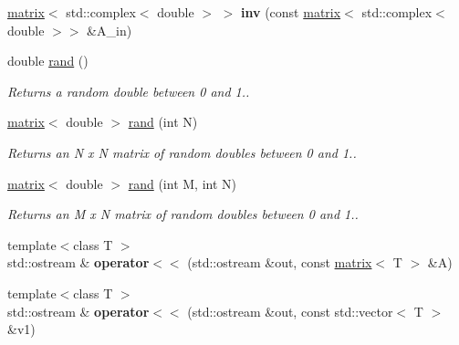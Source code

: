 \begin{DoxyCompactItemize}
\item 
\hypertarget{namespacekeycpp_a6b74369f5415c3ed45f63995149ad992}{\hyperlink{classkeycpp_1_1matrix}{matrix}$<$ std\-::complex$<$ double $>$ $>$ {\bfseries inv} (const \hyperlink{classkeycpp_1_1matrix}{matrix}$<$ std\-::complex$<$ double $>$$>$ \&A\-\_\-in)}\label{namespacekeycpp_a6b74369f5415c3ed45f63995149ad992}

\item 
\hypertarget{namespacekeycpp_a5ef5c1f5951e8182a7c4ec9612f3f7e1}{double \hyperlink{namespacekeycpp_a5ef5c1f5951e8182a7c4ec9612f3f7e1}{rand} ()}\label{namespacekeycpp_a5ef5c1f5951e8182a7c4ec9612f3f7e1}

\begin{DoxyCompactList}\small\item\em Returns a random double between 0 and 1.. \end{DoxyCompactList}\item 
\hypertarget{namespacekeycpp_a53e0eb41dbd6cddc6ac15d92d68c7aee}{\hyperlink{classkeycpp_1_1matrix}{matrix}$<$ double $>$ \hyperlink{namespacekeycpp_a53e0eb41dbd6cddc6ac15d92d68c7aee}{rand} (int N)}\label{namespacekeycpp_a53e0eb41dbd6cddc6ac15d92d68c7aee}

\begin{DoxyCompactList}\small\item\em Returns an N x N matrix of random doubles between 0 and 1.. \end{DoxyCompactList}\item 
\hypertarget{namespacekeycpp_adbc446e99edbcde1d69bfe2c74dc3c80}{\hyperlink{classkeycpp_1_1matrix}{matrix}$<$ double $>$ \hyperlink{namespacekeycpp_adbc446e99edbcde1d69bfe2c74dc3c80}{rand} (int M, int N)}\label{namespacekeycpp_adbc446e99edbcde1d69bfe2c74dc3c80}

\begin{DoxyCompactList}\small\item\em Returns an M x N matrix of random doubles between 0 and 1.. \end{DoxyCompactList}\item 
\hypertarget{namespacekeycpp_a55e8bada51586c0561e1b32ca1ab5f2a}{{\footnotesize template$<$class T $>$ }\\std\-::ostream \& {\bfseries operator$<$$<$} (std\-::ostream \&out, const \hyperlink{classkeycpp_1_1matrix}{matrix}$<$ T $>$ \&A)}\label{namespacekeycpp_a55e8bada51586c0561e1b32ca1ab5f2a}

\item 
\hypertarget{namespacekeycpp_a300d8f6e8992c7b33156492d884bd621}{{\footnotesize template$<$class T $>$ }\\std\-::ostream \& {\bfseries operator$<$$<$} (std\-::ostream \&out, const std\-::vector$<$ T $>$ \&v1)}\label{namespacekeycpp_a300d8f6e8992c7b33156492d884bd621}


\end{DoxyCompactItemize}
